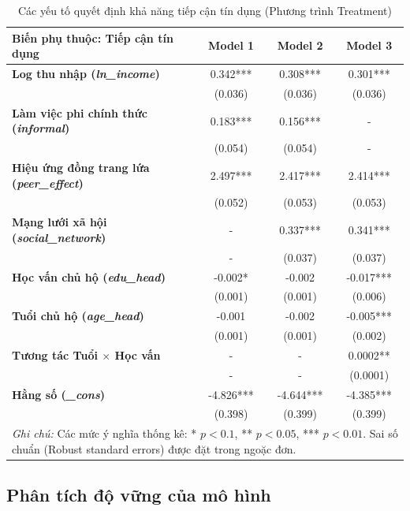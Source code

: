 \documentclass[12pt,a4paper]{report}
\begin{document}
\begin{table}[htbp]
	\centering
	\caption{Các yếu tố quyết định khả năng tiếp cận tín dụng (Phương trình Treatment)}
	\label{tab:treatment_eq}
	\renewcommand{\arraystretch}{1.2}
	\begin{tabular}{lccc}
		\hline
		\textbf{Biến phụ thuộc: Tiếp cận tín dụng} & \textbf{Model 1} & \textbf{Model 2} & \textbf{Model 3} \\
		\hline
		\textbf{Log thu nhập (\textit{ln\_income})} & 0.342*** & 0.308*** & 0.301*** \\
		& (0.036) & (0.036) & (0.036) \\
		\textbf{Làm việc phi chính thức (\textit{informal})} & 0.183*** & 0.156*** & - \\
		& (0.054) & (0.054) & - \\
		\textbf{Hiệu ứng đồng trang lứa (\textit{peer\_effect})} & 2.497*** & 2.417*** & 2.414*** \\
		& (0.052) & (0.053) & (0.053) \\
		\textbf{Mạng lưới xã hội (\textit{social\_network})} & - & 0.337*** & 0.341*** \\
		& - & (0.037) & (0.037) \\
		\textbf{Học vấn chủ hộ (\textit{edu\_head})} & -0.002* & -0.002 & -0.017*** \\
		& (0.001) & (0.001) & (0.006) \\
		\textbf{Tuổi chủ hộ (\textit{age\_head})} & -0.001 & -0.002 & -0.005*** \\
		& (0.001) & (0.001) & (0.002) \\
		\textbf{Tương tác Tuổi $\times$ Học vấn} & - & - & 0.0002** \\
		& - & - & (0.0001) \\
		\textbf{Hằng số (\textit{\_cons})} & -4.826*** & -4.644*** & -4.385*** \\
		& (0.398) & (0.399) & (0.399) \\
		\hline
		\multicolumn{4}{p{13cm}}{\footnotesize \textit{Ghi chú:} Các mức ý nghĩa thống kê: * $p < 0.1$, ** $p < 0.05$, *** $p < 0.01$. Sai số chuẩn (Robust standard errors) được đặt trong ngoặc đơn.} \\
	\end{tabular}
\end{table}

\subsection{Phân tích độ vững của mô hình}
\end{document}
